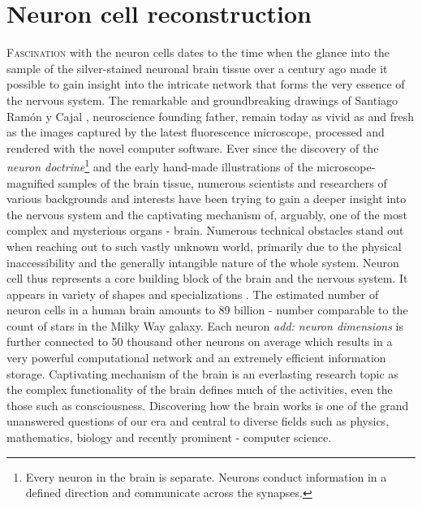 \section{Neuron cell reconstruction} 
\lettrine{F}{ascination} with the neuron cells dates to the time when the glance into the sample of the silver-stained neuronal brain tissue over a century ago made it possible to gain insight into the intricate network that forms the very essence of the nervous system. The remarkable and groundbreaking drawings of Santiago Ram\'{o}n y Cajal \cite{swanson2017,ramon2008histologia}, neuroscience founding father, remain today as vivid as and fresh as the images captured by the latest fluorescence microscope, processed and rendered with the novel computer software. Ever since the discovery of the \textit{neuron doctrine}\footnote{Every neuron in the brain is separate. Neurons conduct information in a defined direction and communicate across the synapses.} \cite{glickstein2006golgi} and the early hand-made illustrations of the microscope-magnified samples of the brain tissue, numerous scientists and researchers of various backgrounds and interests have been trying to gain a deeper insight into the nervous system and the captivating mechanism of, arguably, one of the most complex and mysterious organs - brain. Numerous technical obstacles stand out when reaching out to such vastly unknown world, primarily due to the physical inaccessibility and the generally intangible nature of the whole system. Neuron cell thus represents a core building block of the brain and the nervous system. It appears in variety of shapes and specializations \cite{ascolitrees}. The estimated number of neuron cells in a human brain amounts to 89 billion \cite{herculano2009human} - number comparable to the count of stars in the Milky Way galaxy. Each neuron \textit{add: neuron dimensions} is further connected to 50 thousand other neurons on average which results in a very powerful computational network and an extremely efficient information storage. Captivating mechanism of the brain is an everlasting research topic as the complex functionality of the brain defines much of the activities, even the those such as consciousness. Discovering how the brain works is one of the grand unanswered questions of our era and central to diverse fields such as physics, mathematics, biology and recently prominent - computer science.

